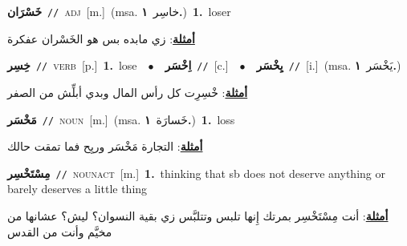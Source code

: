 \documentclass[10pt,a4paper,twoside]{article} %
\begin{document}
\begin{multicols}{2}
{\setlength\topsep{0pt}\textbf{\foreignlanguage{arabic}{خَسْرَان}}\ {\color{gray}\texttt{//}\color{black}}\ \textsc{adj}\ [m.]\ \color{gray}(msa. \foreignlanguage{arabic}{خاسِر}~\foreignlanguage{arabic}{\textbf{١.}})\color{black}\ \textbf{1.}~loser\  \begin{flushright}\color{gray}\foreignlanguage{arabic}{\textbf{\underline{\foreignlanguage{arabic}{أمثلة}}}: زي مابده بس هو الخَسْران عفكرة}\end{flushright}\color{black}} \vspace{2mm}

{\setlength\topsep{0pt}\textbf{\foreignlanguage{arabic}{خِسِر}}\ {\color{gray}\texttt{//}\color{black}}\ \textsc{verb}\ [p.]\ \textbf{1.}~lose\ \ $\bullet$\ \ \setlength\topsep{0pt}\textbf{\foreignlanguage{arabic}{اِخْسَر}}\ {\color{gray}\texttt{//}\color{black}}\ [c.]\ \ $\bullet$\ \ \setlength\topsep{0pt}\textbf{\foreignlanguage{arabic}{يِخْسَر}}\ {\color{gray}\texttt{//}\color{black}}\ [i.]\ \color{gray}(msa. \foreignlanguage{arabic}{يَخْسَر}~\foreignlanguage{arabic}{\textbf{١.}})\color{black}\  \begin{flushright}\color{gray}\foreignlanguage{arabic}{\textbf{\underline{\foreignlanguage{arabic}{أمثلة}}}: خْسِرِت كل رأس المال وبدي أبلِّش من الصفر}\end{flushright}\color{black}} \vspace{2mm}

{\setlength\topsep{0pt}\textbf{\foreignlanguage{arabic}{مَخْسَر}}\ {\color{gray}\texttt{//}\color{black}}\ \textsc{noun}\ [m.]\ \color{gray}(msa. \foreignlanguage{arabic}{خَسارَة}~\foreignlanguage{arabic}{\textbf{١.}})\color{black}\ \textbf{1.}~loss\  \begin{flushright}\color{gray}\foreignlanguage{arabic}{\textbf{\underline{\foreignlanguage{arabic}{أمثلة}}}: التجارة مَخْسَر وريِح فما تمقت حالك}\end{flushright}\color{black}} \vspace{2mm}

{\setlength\topsep{0pt}\textbf{\foreignlanguage{arabic}{مِسْتَخْسِر}}\ {\color{gray}\texttt{//}\color{black}}\ \textsc{noun\textunderscore act}\ [m.]\ \textbf{1.}~thinking that sb does not deserve anything or barely deserves a little thing\  \begin{flushright}\color{gray}\foreignlanguage{arabic}{\textbf{\underline{\foreignlanguage{arabic}{أمثلة}}}: أنت مِسْتَخْسِر بمرتك إِنها تلبس وتتلبَّس زي بقية النسوان؟ ليش؟ عشانها من مخيَّم وأنت من القدس}\end{flushright}\color{black}} \vspace{2mm}


\end{multicols}
\end{document}
